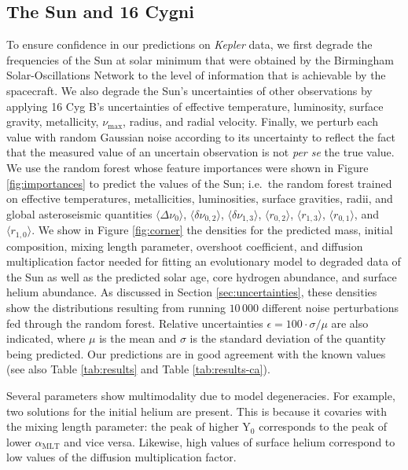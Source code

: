 \documentclass[manuscript,linenumbers]{aastex6}
\newif\ifref
\newcommand{\mb}[1]{\ifref\boldmath\textbf{#1}\unboldmath\else #1\fi}
\begin{document}
\subsection{The Sun and 16 Cygni}
To ensure confidence in our predictions on \emph{Kepler} data, we first degrade the frequencies of the Sun at solar minimum that were obtained by the Birmingham Solar-Oscillations Network \citep[BiSON;][]{2014MNRAS.439.2025D} to the level of information that is achievable by the spacecraft. We also degrade the Sun's uncertainties of \mb{other} observations by applying 16 Cyg B's uncertainties of effective temperature, luminosity, surface gravity, metallicity, $\nu_{\max}$, radius, and radial velocity. Finally, we perturb each value with random Gaussian noise according to its uncertainty to reflect the fact that the measured value of an uncertain observation is not \emph{per se} the true value. We use the random forest whose feature importances were shown in Figure \ref{fig:importances} to predict the values of the Sun; i.e.\ the random forest trained on effective temperatures, metallicities, luminosities, surface gravities, radii, and global asteroseismic \mb{quantities} $\langle \Delta\nu_0 \rangle$, $\langle \delta\nu_{0,2} \rangle$, $\langle \delta\nu_{1,3} \rangle$, $\langle r_{0,2} \rangle$, $\langle r_{1,3} \rangle$, $\langle r_{0,1} \rangle$, and $\langle r_{1,0} \rangle$. We show in Figure \ref{fig:corner} the densities for the predicted mass, initial composition, mixing length parameter, overshoot coefficient, and diffusion multiplication factor needed for fitting an evolutionary model to degraded data of the Sun as well as the predicted solar age, core hydrogen abundance, and surface helium abundance. \mb{As discussed in Section \ref{sec:uncertainties}, these densities show the distributions resulting from running $10\,000$ different noise perturbations fed through the random forest.} Relative uncertainties $\epsilon=100\cdot\sigma/\mu$ are also indicated, where $\mu$ is the mean and $\sigma$ is the standard deviation of the quantity being predicted. Our predictions are in good agreement with the known values (see also Table \ref{tab:results} and Table \ref{tab:results-ca}). 

Several parameters show multimodality due to model degeneracies. For example, two solutions for the initial helium are present. This is because it covaries with the mixing length parameter: the peak of \mb{higher} Y$_0$ corresponds to the peak of \mb{lower} $\alpha_{\text{MLT}}$ and vice versa. Likewise, high values of surface helium correspond to low values of the diffusion \mb{multiplication} factor. 
\end{document}
